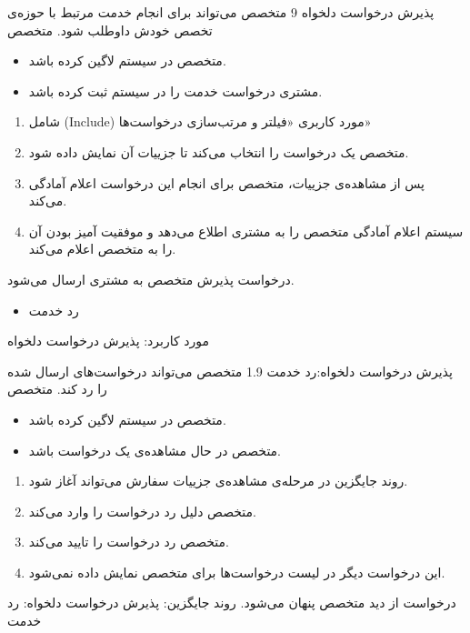 {
\usecase
{پذیرش درخواست دلخواه}
{9}
{متخصص می‌تواند برای انجام خدمت مرتبط با حوزه‌ی تخصص خودش داوطلب شود.}
{متخصص}
{}
{	
	\begin{itemize}
		\vspace*{-0.6cm}
		\item 
		متخصص در سیستم لاگین کرده باشد.
		\item
		مشتری درخواست خدمت را در سیستم ثبت کرده باشد.
	\end{itemize}
}
{
	\vspace*{-0.6cm}
	\begin{enumerate}
		\item 
		شامل (Include) مورد کاربری «فیلتر و مرتب‌سازی درخواست‌ها»
		\item
		متخصص یک درخواست را انتخاب می‌کند تا جزییات آن نمایش داده شود.
		\item
		پس از مشاهده‌ی جزییات، متخصص برای انجام این درخواست اعلام آمادگی می‌کند.
		\item
		سیستم اعلام آمادگی متخصص را به مشتری اطلاع می‌دهد و موفقیت آمیز بودن آن را به متخصص اعلام می‌کند.
	\end{enumerate}
}
{درخواست پذیرش متخصص به مشتری ارسال می‌شود.}
{
	\begin{itemize}
		\vspace*{-0.6cm}
		\item
		رد خدمت
	\end{itemize}
}
{
	مورد کاربرد: پذیرش درخواست دلخواه
}

\alternativeflow
{
	 پذیرش درخواست دلخواه:رد خدمت
}
{1.9}
{
	متخصص می‌تواند درخواست‌های ارسال شده را رد کند.
}
{
	متخصص
}
{}
{
	\begin{itemize}
		\vspace*{-0.6cm}
		\item 
		متخصص در سیستم لاگین کرده باشد.
		\item
		متخصص در حال مشاهده‌ی یک درخواست باشد.
	\end{itemize}
}
{
	\vspace*{-0.6cm}
	\begin{enumerate}
		\item 
		روند جایگزین در مرحله‌ی مشاهده‌ی جزییات سفارش می‌تواند آغاز شود.
		\item
		متخصص دلیل رد درخواست را وارد می‌کند.
		\item
		متخصص رد درخواست را تایید می‌کند.
		\item
		این درخواست دیگر در لیست درخواست‌ها برای متخصص نمایش داده نمی‌شود.
	\end{enumerate}
}
{
	درخواست از دید متخصص پنهان می‌شود.
}
{
روند جایگزین: پذیرش درخواست دلخواه: رد خدمت
}
}

